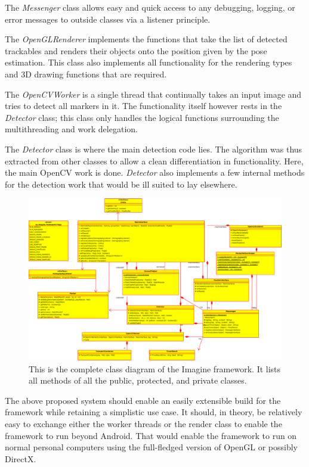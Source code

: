 The \textit{Messenger} class allows easy and quick access to any debugging, logging, or error messages to outside classes via a listener principle.

The \textit{OpenGLRenderer} implements the functions that take the list of detected trackables and renders their objects onto the position given by the pose estimation.
This class also implements all functionality for the rendering types and 3D drawing functions that are required.

The \textit{OpenCVWorker} is a single thread that continually takes an input image and tries to detect all markers in it.
The functionality itself however rests in the \textit{Detector} class; this class only handles the logical functions surrounding the multithreading and work delegation.

The \textit{Detector} class is where the main detection code lies.
The algorithm was thus extracted from other classes to allow a clean differentiation in functionality.
Here, the main OpenCV work is done.
\textit{Detector} also implements a few internal methods for the detection work that would be ill suited to lay elsewhere.

\begin{figure}
	\centering
	\includegraphics[width=21cm]{img/complete_class_diagram.eps}
	\caption[Complete Class Diagram]{This is the complete class diagram of the Imagine framework. It lists all methods of all the public, protected, and private classes.}
	\label{fig:complete_class_diagram}
\end{figure}

The above proposed system should enable an easily extensible build for the framework while retaining a simplistic use case.
It should, in theory, be relatively easy to exchange either the worker threads or the render class to enable the framework to run beyond Android.
That would enable the framework to run on normal personal computers using the full-fledged version of OpenGL or possibly DirectX.


